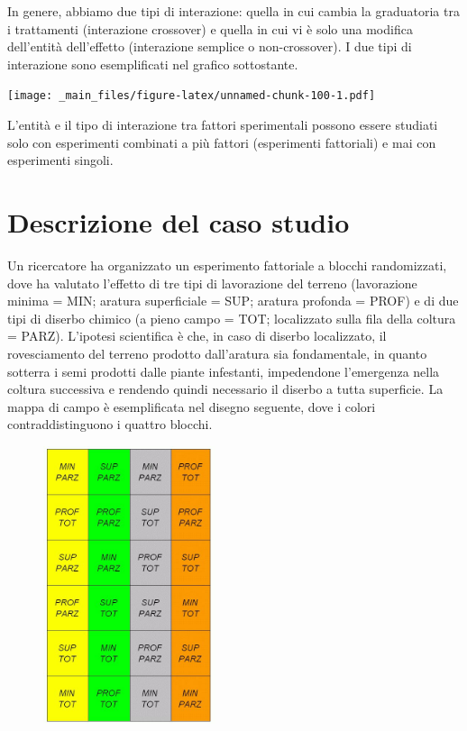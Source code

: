 \documentclass[a4paper,12pt,oneside]{book}
\theoremstyle{definition}
\theoremstyle{definition}
\theoremstyle{definition}
\theoremstyle{remark}
\begin{document}
In genere, abbiamo due tipi di interazione: quella in cui cambia la
graduatoria tra i trattamenti (interazione crossover) e quella in cui vi
è solo una modifica dell'entità dell'effetto (interazione semplice o
non-crossover). I due tipi di interazione sono esemplificati nel grafico
sottostante.

\texttt{[image: \_main\_files/figure-latex/unnamed-chunk-100-1.pdf]}

L'entità e il tipo di interazione tra fattori sperimentali possono
essere studiati solo con esperimenti combinati a più fattori
(esperimenti fattoriali) e mai con esperimenti singoli.

\section{Descrizione del caso studio}\label{descrizione-del-caso-studio}

Un ricercatore ha organizzato un esperimento fattoriale a blocchi
randomizzati, dove ha valutato l'effetto di tre tipi di lavorazione del
terreno (lavorazione minima = MIN; aratura superficiale = SUP; aratura
profonda = PROF) e di due tipi di diserbo chimico (a pieno campo = TOT;
localizzato sulla fila della coltura = PARZ). L'ipotesi scientifica è
che, in caso di diserbo localizzato, il rovesciamento del terreno
prodotto dall'aratura sia fondamentale, in quanto sotterra i semi
prodotti dalle piante infestanti, impedendone l'emergenza nella coltura
successiva e rendendo quindi necessario il diserbo a tutta superficie.
La mappa di campo è esemplificata nel disegno seguente, dove i colori
contraddistinguono i quattro blocchi.

\begin{figure}
\centering
\includegraphics[width=0.45000\textwidth]{_images/SchemaFattorialeBlocchi.jpg}
\caption{}
\end{figure}
\end{document}

